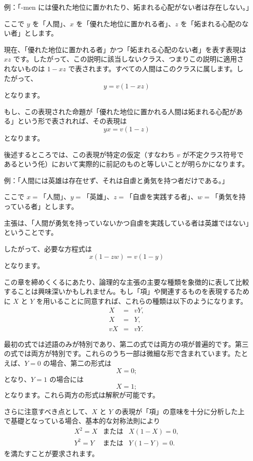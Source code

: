 \documentclass[a4paper,11pt,openany]{ltjsbook}
\begin{document}
例：「-men には優れた地位に置かれたり、妬まれる心配がない者は存在しない。」

ここで \(y\) を「人間」、\(x\) を「優れた地位に置かれる者」、\(z\) を「妬まれる心配のない者」とします。

現在、「優れた地位に置かれる者」かつ「妬まれる心配のない者」を表す表現は \(xz\) です。したがって、この説明に該当しないクラス、つまりこの説明に適用されないものは \(1 - xz\) で表されます。すべての人間はこのクラスに属します。したがって、
\[
y = v \left( 1 - xz \right)
\]
となります。

もし、この表現された命題が「優れた地位に置かれる人間は妬まれる心配がある」という形で表されれば、その表現は
\[
yx = v \left( 1 - z \right)
\]
となります。

後述するところでは、この表現が特定の仮定（すなわち \(v\) が不定クラス符号であるという仛）において実際的に前記のものと等しいことが明らかになります。

例：「人間には英雄は存在せず、それは自虐と勇気を持つ者だけである。」

ここで \(x = \)「人間」、\(y = \)「英雄」、\(z = \)「自虐を実践する者」、\(w = \)「勇気を持っている者」とします。

主張は、「人間が勇気を持っていないかつ自虐を実践している者は英雄ではない」ということです。

したがって、必要な方程式は
\[
x \left( 1 - zw \right) = v \left( 1 - y \right)
\]
となります。

この章を締めくくるにあたり、論理的な主張の主要な種類を象徴的に表して比較することは興味深いかもしれません。もし「項」や関連するものを表現するために $X$ と $Y$ を用いることに同意すれば、これらの種類は以下のようになります。
\begin{eqnarray*}
X &=& vY, \\
X &=& Y, \\
vX &=& vY.
\end{eqnarray*}

最初の式では述語のみが特別であり、第二の式では両方の項が普遍的です。第三の式では両方が特別です。これらのうち一部は微細な形で含まれています。たとえば、$Y = 0$ の場合、第二の形式は
\[
X = 0;
\]
となり、$Y = 1$ の場合には
\[
X = 1;
\]
となります。これら両方の形式は解釈が可能です。

さらに注意すべき点として、$X$ と $Y$ の表現が「項」の意味を十分に分析した上で基礎となっている場合、基本的な対称法則により
\begin{eqnarray*}
X^2 = X &\text{または}& X (1 - X) = 0, \\
Y^2 = Y &\text{または}& Y (1 - Y) = 0.
\end{eqnarray*}
を満たすことが要求されます。
\end{document}
